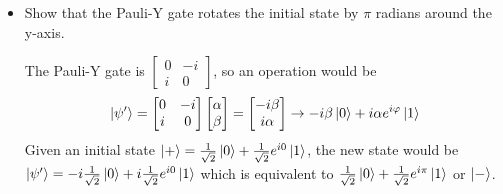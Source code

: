 \documentclass[10pt,letterpaper]{article}
\begin{document}
\begin{enumerate}
\begin{enumerate}[a)]
\begin{enumerate}[i.]
\begin{itemize}
\color{violet}
Given some state $\ket{\psi}$, the alternative representation of its probability is $\ket{\psi} = \begin{bmatrix}
\alpha \\
\beta
\end{bmatrix}$. The Pauli-X gate is represented by matrix $\begin{bmatrix}
0 & 1 \\
1 & 0 
\end{bmatrix}$, so an operation on state $\ket{\psi}$ would be
\begin{gather*}
\ket{\psi'} = \begin{bmatrix}
0 & 1 \\
1 & 0 
\end{bmatrix}\begin{bmatrix}
\alpha \\
\beta 
\end{bmatrix} = \begin{bmatrix}
\beta \\
\alpha 
\end{bmatrix} \rightarrow \beta\ket{0} + \alpha e^{i\varphi}\ket{1}
\end{gather*}
Given that the initial state of the qubit is in $\ket{0}$, $\ket{\psi} = 1\ket{0} + 0\ket{1}$, the Pauli-X gate would give new state $\ket{\psi'} = 0\ket{0} + 1\ket{1}$. 
\color{black}

\item Show that the Pauli-Y gate rotates the initial state by $\pi$ radians around the y-axis. 

\color{violet}
The Pauli-Y gate is $\begin{bmatrix}
0 & -i \\
i & 0 
\end{bmatrix}$, so an operation would be
\begin{gather*}
\ket{\psi'} = \begin{bmatrix}
0 & -i \\
i & 0 
\end{bmatrix}\begin{bmatrix}
\alpha \\
\beta 
\end{bmatrix} = \begin{bmatrix}
-i\beta \\
i\alpha
\end{bmatrix} \rightarrow -i\beta\ket{0} + i\alpha e^{i\varphi}\ket{1}
\end{gather*}
Given an initial state $\ket{+} = \frac{1}{\sqrt{2}}\ket{0} + \frac{1}{\sqrt{2}}e^{i0}\ket{1}$, the new state would be $\ket{\psi'} = -i\frac{1}{\sqrt{2}}\ket{0} + i\frac{1}{\sqrt{2}}e^{i0}\ket{1}$ which is equivalent to $\frac{1}{\sqrt{2}}\ket{0} + \frac{1}{\sqrt{2}}e^{i\pi}\ket{1}$ or $\ket{-}$. 
\color{black}


\end{itemize}
\end{enumerate}
\end{enumerate}
\end{enumerate}
\end{document}
